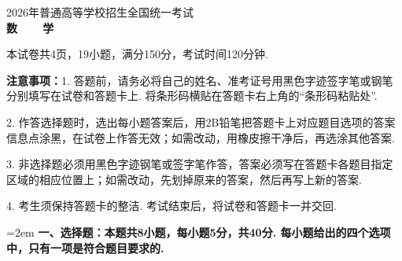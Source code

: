 \documentclass[12pt,a4paper]{article}
\begin{document}
	
	\vspace*{0.5cm}
	
	\begin{center}
		{\Large 2026年普通高等学校招生全国统一考试}\\[0.8cm]
		{\LARGE\bfseries 数~~~~学}
	\end{center}
	
	\noindent 本试卷共4页，19小题，满分150分，考试时间120分钟.
	
	\noindent\hangindent=73pt {\bfseries 注意事项：}1. 答题前，请务必将自己的姓名、准考证号用黑色字迹签字笔或钢笔分别填写在试卷和答题卡上. 将条形码横贴在答题卡右上角的“条形码粘贴处”.
	
	\noindent\hangindent=73pt\hspace{61pt}2. 作答选择题时，选出每小题答案后，用2B铅笔把答题卡上对应题目选项的答案信息点涂黑，在试卷上作答无效；如需改动，用橡皮擦干净后，再选涂其他答案.
	
	\noindent\hangindent=73pt\hspace{61pt}3. 非选择题必须用黑色字迹钢笔或签字笔作答，答案必须写在答题卡各题目指定区域的相应位置上；如需改动，先划掉原来的答案，然后再写上新的答案.
	
	\noindent\hangindent=73pt\hspace{61pt}4. 考生须保持答题卡的整洁. 考试结束后，将试卷和答题卡一并交回.
	
	\vspace{0.3cm}
	
	\noindent\hangindent=2em {\bfseries 一、选择题：本题共8小题，每小题5分，共40分. 每小题给出的四个选项中，只有一项是符合题目要求的.}
	
\end{document}
